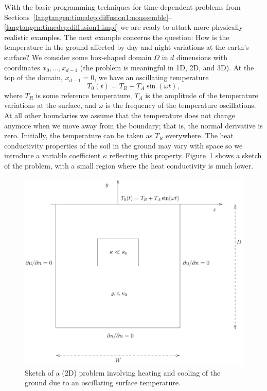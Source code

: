 With the basic programming techniques for time-dependent problems from
Sections~\ref{langtangen:timedep:diffusion1:noassemble}--\ref{langtangen:timedep:diffusion1:impl}
we are ready to attack more physically realistic examples.  The next
example concerns the question: How is the temperature in the ground
affected by day and night variations at the earth's surface?  We
consider some box-shaped domain $\Omega$ in $d$ dimensions with
coordinates $x_0,\ldots,x_{d-1}$ (the problem is meaningful in 1D, 2D,
and 3D).  At the top of the domain, $x_{d-1}=0$, we have an
oscillating temperature
\[ T_0(t) = T_R + T_A\sin (\omega t),\]
where $T_R$ is some reference temperature, $T_A$ is the amplitude of
the temperature variations at the surface, and $\omega$ is the frequency
of the temperature oscillations.
At all other boundaries we assume
that the temperature does not change anymore when we move away from
the boundary; that is, the normal derivative is zero.
Initially, the temperature can be taken as $T_R$ everywhere.
The heat conductivity properties of the soil in the
ground may vary with space so
we introduce a variable coefficient $\kappa$ reflecting this property.
Figure~\ref{langtangen:timedep:diffusion2:sin:fig1} shows a sketch of the
problem, with a small region where the heat conductivity is much lower.
\begin{figure}
\label{langtangen:timedep:diffusion2:sin:fig1}
\centerline{
\includegraphics[width=0.8\linewidth]{chapters/langtangen/pdf/daynight.pdf}
  }
  \caption{
  Sketch of a (2D) problem involving heating and cooling of the ground due
  to an oscillating surface temperature.
  }
\end{figure}

